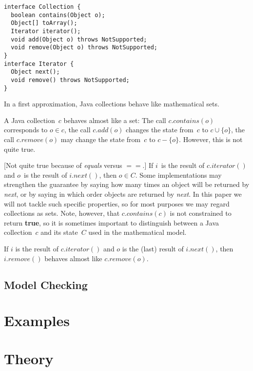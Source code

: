 \documentclass[a4paper]{article}
\theoremstyle{slanted}
\theoremstyle{definition}
\theoremstyle{remark}
\begin{document}
\begin{lstlisting}
interface Collection {
  boolean contains(Object o);
  Object[] toArray();
  Iterator iterator();
  void add(Object o) throws NotSupported;
  void remove(Object o) throws NotSupported;
}
interface Iterator {
  Object next();
  void remove() throws NotSupported;
}
\end{lstlisting}

In a first approximation, Java collections behave like mathematical sets.

A Java collection~$c$ behaves almost like a set:
The call $c.\mathit{contains}(o)$ corresponds to $o\in c$, the call $c.\mathit{add}(o)$ changes the state from~$c$ to $c\cup\{o\}$, the call $c.\mathit{remove}(o)$ may change the state from~$c$ to $c-\{o\}$.
However, this is not quite true.




[Not quite true because of \textit{equals} versus $==$.]
If $i$~is the result of $c.\mathit{iterator}()$ and $o$~is the result of $i.\mathit{next}()$, then $o\in C$.
Some implementations may strengthen the guarantee by saying how many times an object will be returned by \textit{next}, or by saying in which order objects are returned by \textit{next}.
In this paper we will not tackle such specific properties, so for most purposes we may regard collections as sets.
Note, however, that $c.\mathit{contains}(c)$ is not constrained to return \textbf{true}, so it is sometimes important to distinguish between a Java collection~$c$ and its state~$C$ used in the mathematical model.

If $i$ is the result of $c.\mathit{iterator}()$ and $o$ is the (last) result of $i.\mathit{next}()$, then $i.\mathit{remove}()$ behaves almost like $c.\mathit{remove}(o)$.

\subsection{Model Checking}

\section{Examples}

\section{Theory}
\end{document}
